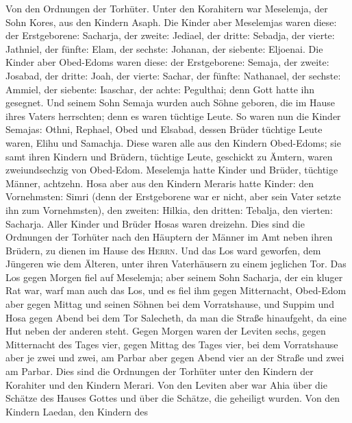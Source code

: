  Von den Ordnungen der Torhüter. Unter den Korahitern war
Meselemja, der Sohn Kores, aus den Kindern Asaph.  Die
Kinder aber Meselemjas waren diese: der Erstgeborene: Sacharja, der
zweite: Jediael, der dritte: Sebadja, der vierte: Jathniel,
 der fünfte: Elam, der sechste: Johanan, der siebente:
Eljoenai.  Die Kinder aber Obed-Edoms waren diese: der
Erstgeborene: Semaja, der zweite: Josabad, der dritte: Joah, der vierte:
Sachar, der fünfte: Nathanael,  der sechste: Ammiel, der
siebente: Isaschar, der achte: Pegulthai; denn Gott hatte ihn gesegnet.
 Und seinem Sohn Semaja wurden auch Söhne geboren, die im
Hause ihres Vaters herrschten; denn es waren tüchtige Leute.
 So waren nun die Kinder Semajas: Othni, Rephael, Obed und
Elsabad, dessen Brüder tüchtige Leute waren, Elihu und Samachja.
 Diese waren alle aus den Kindern Obed-Edoms; sie samt
ihren Kindern und Brüdern, tüchtige Leute, geschickt zu Ämtern, waren
zweiundsechzig von Obed-Edom.  Meselemja hatte Kinder und
Brüder, tüchtige Männer, achtzehn.  Hosa aber aus den
Kindern Meraris hatte Kinder: den Vornehmsten: Simri (denn der
Erstgeborene war er nicht, aber sein Vater setzte ihn zum Vornehmsten),
 den zweiten: Hilkia, den dritten: Tebalja, den vierten:
Sacharja. Aller Kinder und Brüder Hosas waren dreizehn. 
Dies sind die Ordnungen der Torhüter nach den Häuptern der Männer im Amt
neben ihren Brüdern, zu dienen im Hause des \textsc{Herrn}.
 Und das Los ward geworfen, dem Jüngeren wie dem Älteren,
unter ihren Vaterhäusern zu einem jeglichen Tor.  Das Los
gegen Morgen fiel auf Meselemja; aber seinem Sohn Sacharja, der ein
kluger Rat war, warf man auch das Los, und es fiel ihm gegen
Mitternacht,  Obed-Edom aber gegen Mittag und seinen
Söhnen bei dem Vorratshause,  und Suppim und Hosa gegen
Abend bei dem Tor Salecheth, da man die Straße hinaufgeht, da eine Hut
neben der anderen steht.  Gegen Morgen waren der Leviten
sechs, gegen Mitternacht des Tages vier, gegen Mittag des Tages vier,
bei dem Vorratshause aber je zwei und zwei,  am Parbar
aber gegen Abend vier an der Straße und zwei am Parbar. 
Dies sind die Ordnungen der Torhüter unter den Kindern der Korahiter und
den Kindern Merari.  Von den Leviten aber war Ahia über
die Schätze des Hauses Gottes und über die Schätze, die geheiligt
wurden.  Von den Kindern Laedan, den Kindern des
